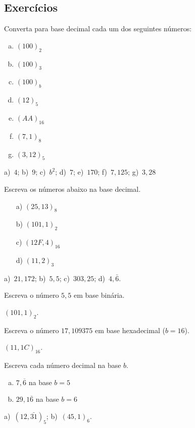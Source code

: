 \subsection*{Exercícios}

\indent 
\begin{exer} Converta para base decimal cada um dos seguintes números:
    \begin{enumerate}[a)]
    \item $(100)_2$
    \item $(100)_3$
    \item $(100)_b$
    \item $(12)_5$
    \item $(AA)_{16}$
    \item $(7,1)_8$
    \item $(3,12)_5$
    \end{enumerate}    
\end{exer}
\begin{resp}
   a)~$4$; b)~$9$; c)~$b^2$; d)~$7$; e)~$170$; f)~$7,125$; g)~$3,28$
\end{resp}

\begin{exer}Escreva os números abaixo na base decimal.
  \begin{enumerate}[a)]
  \item[a)] $(25,13)_8$
  \item[b)] $(101,1)_2$
  \item[c)] $(12F,4)_{16}$
  \item[d)] $(11,2)_{3}$
  \end{enumerate}
\end{exer}
\begin{resp}
  a)~$21,172$; b)~$5,5$; c)~$303,25$; d)~$4,\bar{6}$.
\end{resp}

\begin{exer} 
  Escreva o número $5,5$ em base binária.
\end{exer}
\begin{resp}
    $(101,1)_2$.
\end{resp}

\begin{exer} 
  Escreva o número $17,109375$ em base hexadecimal ($b=16$).
\end{exer}
\begin{resp} $(11,1C)_{16}$.
\end{resp}

\begin{exer} Escreva cada número decimal na base $b$.
  \begin{enumerate}[a)]
  \item $7,\overline{6}$ na base $b=5$
  \item $29,1\overline{6}$ na base $b=6$
  \end{enumerate}
\end{exer}
\begin{resp}
  a)~$(12,\bar{31})_5$; b)~$(45,1)_6$.
\end{resp}

